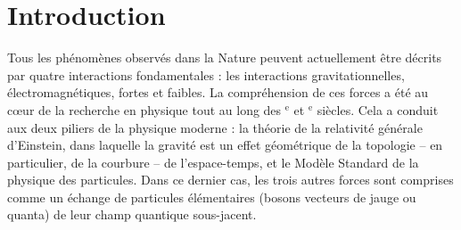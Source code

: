 \chapter{Introduction}
\label{appendix:ExtendedAbstractFrench}

Tous les phénomènes observés dans la Nature peuvent actuellement être décrits par quatre interactions fondamentales : les interactions gravitationnelles, électromagnétiques, fortes et faibles. La compréhension de ces forces a été au cœur de la recherche en physique tout au long des $^{\textrm{e}}$ et $^{\textrm{e}}$ siècles. Cela a conduit aux deux piliers de la physique moderne : la théorie de la relativité générale d'Einstein, dans laquelle la gravité est un effet géométrique de la topologie -- en particulier, de la courbure -- de l'espace-temps, et le Modèle Standard de la physique des particules. Dans ce dernier cas, les trois autres forces sont comprises comme un échange de particules élémentaires (bosons vecteurs de jauge ou quanta) de leur champ quantique sous-jacent.

